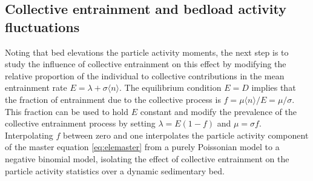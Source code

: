\subsection{Collective entrainment and bedload activity fluctuations}
\label{sec:elecolent}
Noting that bed elevations \DIFdelbegin {}\DIFdelend \DIFaddbegin {}\DIFaddend the particle activity moments, the next step is to study the influence of collective entrainment on this effect by modifying the relative proportion of the individual to collective contributions in the mean entrainment rate $E=\lambda + \sigma \langle n \rangle $.
The equilibrium condition $E=D$ implies that the fraction of entrainment due to the collective process is $f = \mu\langle n \rangle/E = \mu/\sigma$. This fraction can be used to hold $E$ constant and modify the prevalence of the collective entrainment process by setting $\lambda = E(1-f)$ and $\mu= \sigma f$. Interpolating $f$ between zero and one interpolates the particle activity component of the master equation \ref{eq:elemaster} from a purely Poissonian model to a negative binomial model, isolating the effect of collective entrainment on the particle activity statistics over a dynamic sedimentary bed.
